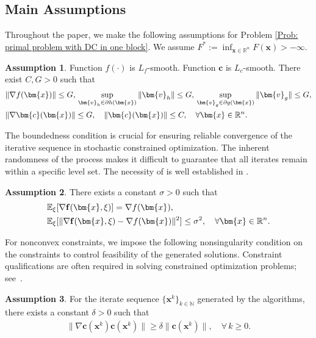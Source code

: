 \documentclass{article}
\theoremstyle{plain}
\theoremstyle{definition}
\newtheorem{assumption}{Assumption}[section]
\theoremstyle{remark}
\newcommand{\RR}{\mathbb{R}}
\newcommand{\EE}{\mathbb{E}}
\newcommand{\NN}{\mathbb{N}}
\newcommand{\bx}{\bm{x}}
\newcommand{\bc}{\bm{c}}
\newcommand{\bv}{\bm{v}}
\newcommand{\tf}{\mathbf{f}}
\numberwithin{equation}{section}
\begin{document}
\subsection{Main Assumptions}
\label{Subsection: main assumptions}
Throughout the paper, we make the following assumptions for Problem \eqref{Prob: primal problem with DC in one block}. {We assume $F^*:=\inf_{\bx\in\RR^n} F(\bx)>-\infty$.}
\begin{assumption}
    \label{Ass: boundedness of c and f} Function $f(\cdot)$ is
    $L_f$-smooth. Function \(\bc\) is \(L_c\)-smooth. There exist $C, G>0$ such that
    \begin{align}
         &\|\nabla f(\bx) \| \leq G,\,
         \sup_{\bv_h\in\partial h(\bx)}\|\bv_h\| \leq G,\,
         \sup_{\bv_g\in\partial g(\bx)}\|\bv_g\| \leq G,\\ \notag
         &\|\nabla \bc(\bx) \| \leq G,\quad
         \| \bc(\bx) \| \leq C,\quad \forall \bx\in\RR^n.\notag
    \end{align}
\end{assumption}
The boundedness condition is crucial for ensuring reliable convergence of the iterative sequence in stochastic constrained optimization. The inherent randomness of the process makes it difficult to guarantee that all iterates remain within a specific level set. The necessity of  is well established in \cite{BeraCurtRobiZhou21, na2021inequality, NaAnitKola22, wang2025complexity,sun2023algorithms}.
\begin{assumption}
    \label{Ass: unbiased gradient oracle} There exists a constant $\sigma > 0$ such that
    \begin{align}
    &\EE_{\xi}[\nabla \tf(\bx, \xi)] = \nabla f(\bx), \notag \\
    & \EE_{\xi}[\| \nabla \tf(\bx, \xi) - \nabla f(\bx) \|^{2}] \leq \sigma^{2}, \quad \forall\bx
    \in \RR^n. \notag
    \end{align}
\end{assumption}
For nonconvex constraints, we impose the following nonsingularity condition on the constraints to control feasibility of the generated solutions. Constraint qualifications are often required in solving constrained optimization problems; see~\citep{shi2025momentum,lu2024variancereducedfirstordermethodsdeterministically,liu2025single,curtis2024worst}.
\begin{assumption}
    \label{Ass: constraints conditions}
    For the iterate sequence $\{\bx^k\}_{k\in\NN}$ generated by the algorithms, there exists a constant $\delta > 0$ such that
    \begin{align*}
        \|\nabla \bc(\bx^k) \bc(\bx^k)\| \geq \delta \| \bc(\bx^k) \|, \quad \forall\, k \geq 0.
    \end{align*}
\end{assumption}
\end{document}
